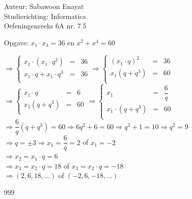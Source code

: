 \documentclass[a4paper]{article}
\begin{document}
  
\noindent \large Auteur: Sabawoon Enayat \\
\noindent \large Studierichting: Informatica\\
\noindent \large Oefeningenreeks 6A nr. 7.5 \\

\medskip

\normalsize

Opgave: $x_1 \cdot x_3 = 36$ en $x^2 + x^4 = 60$

$\Rightarrow \left\{
	\begin{array}{lcr}
		x_1 \cdot (x_1 \cdot q^2)   & = & 36\\
		x_1 \cdot q + x_1 \cdot q^3 & = & 36\\
	\end{array}
\right. \Rightarrow \left\{
	\begin{array}{lcr}
		(x_1 \cdot q)^2 & = & 36\\
		x_1 (q + q^3)   & = & 60\\
	\end{array}
\right.$\\

$\Rightarrow \left\{
	\begin{array}{lcr}
		x_1 \cdot q              & = & 6\\
		x_1 \left(q + q^3\right) & = & 60\\
	\end{array}
\right. \Rightarrow \left\{
	\begin{array}{lcr}
		x_1                            & = & \dfrac{6}{q}\\
		x_1 \cdot \left(q + q^3\right) & = & 60 \\
	\end{array}
\right.$\\

$\Rightarrow \dfrac{6}{q} \left(q + q^3\right) = 60 \Rightarrow 6q^2 + 6 = 60 \Rightarrow q^2 + 1 = 10 \Rightarrow q^2 = 9$\\

$\Rightarrow q = \pm 3 \Rightarrow x_1 = \dfrac{6}{q} = 2$ of $x_1 = -2$\\

$\Rightarrow x_2 = x_1 \cdot q = 6$\\

$\Rightarrow x_3 = x_2 \cdot q = 18$ of $x_3 = x_2 \cdot q = -18$\\

$\Rightarrow (2, 6, 18, ...)$ of $(-2, 6, -18, ...)$\\

\begin{thebibliography}{999}
\end{thebibliography}
\end{document}
